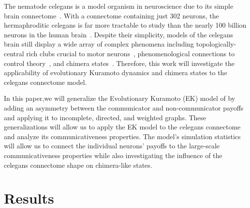 \documentclass[pdflatex,twocolumn,sn-nature,super]{sn-jnl}
\begin{document}
The nematode \gls{celegans}
is a model organism in neuroscience due to
its simple brain connectome~\citep{cook2019whole}.
With a connectome containing just \num{302} neurons,
the hermaphroditic \gls{celegans} is far more tractable to study
than the nearly \num{100} billion neurons
in the human brain~\citep{von2016search}.
Despite their simplicity, models of the \gls{celegans} brain
still display a wide array of complex phenomena including
topologically-central rich clubs
crucial to motor neurons~\citep{towlson2013rich},
phenomenological connections to control theory~\citep{yan2017network},
and chimera states~\citep{hizanidis2016chimera}.
Therefore, this work will investigate the applicability
of evolutionary Kuramoto dynamics and chimera states
to the \gls{celegans} connectome model.

In this paper,we will generalize
the Evolutionary Kuramoto (EK) model
of \tripp{} by adding an asymmetry between
the communicator and non-communicator payoffs
and applying it to incomplete, directed, and weighted graphs.
These generalizations will allow us to apply the EK model
to the \gls{celegans} connectome
and analyze its communicativeness properties.
The model's simulation statistics
will allow us to connect
the individual neurons' payoffs
to the large-scale communicativeness properties
while also investigating the influence
of the \gls{celegans} connectome shape on chimera-like states.

\section{Results}\label{sec:results}
\end{document}
